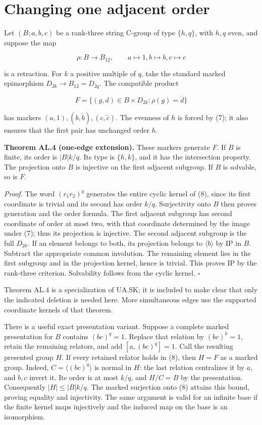 \section{Changing one adjacent order}\label{changing-one-adjacent-order}

Let \((B;a,b,c)\) be a rank-three string C-group of type \(\{h,q\}\), with
\(h,q\) even, and suppose the map

\[\rho:B\longrightarrow B_{12},\qquad a\mapsto1, b\mapsto b, c\mapsto c
\tag{7}\]

is a retraction. For \(k\) a positive multiple of \(q\), take the standard
marked epimorphism \(D_{2k}\to B_{12}=D_{2q}\). The compatible product

\[F=\{(g,d)\in B\times D_{2k}:\rho(g)=\overline d\}\tag{8}\]

has markers \((a,1),(b,\widetilde b),(c,\widetilde c)\). The evenness of
\(h\) is forced by (7); it also ensures that the first pair has unchanged
order \(h\).

\textbf{Theorem AL.4 (one-edge extension).} These markers generate \(F\). If \(B\) is finite, its order
is \(|B|k/q\). Its type is \(\{h,k\}\), and it has the intersection
property. The projection onto \(B\) is injective on the first adjacent
subgroup. If \(B\) is solvable, so is \(F\).

\emph{Proof.} The word \((r_1r_2)^q\) generates the entire cyclic kernel of
(8), since its first coordinate is trivial and its second has order
\(k/q\). Surjectivity onto \(B\) then proves generation and the order formula.
The first adjacent subgroup has second coordinate of order at most two,
with that coordinate determined by the image under (7); thus its
projection is injective. The second adjacent subgroup is the full
\(D_{2k}\). If an element belongs to both, its projection belongs to
\(\langle b\rangle\) by IP in \(B\). Subtract the appropriate common
involution. The remaining element lies in the first subgroup and in the
projection kernel, hence is trivial. This proves IP by the rank-three
criterion. Solvability follows from the cyclic kernel. \(\square\)

Theorem AL.4 is a specialization of UA.SK; it is included to make clear that
only the indicated deletion is needed here. More simultaneous edges use
the supported coordinate kernels of that theorem.

There is a useful exact presentation variant. Suppose a complete marked
presentation for \(B\) contains \((bc)^q=1\). Replace that relation by
\((bc)^k=1\), retain the remaining relators, and add
\([a,(bc)^q]=1\). Call the resulting presented group \(H\). If every retained
relator holds in (8), then \(H=F\) as a marked group. Indeed,
\(C=\langle(bc)^q\rangle\) is normal in \(H\): the last relation centralizes
it by \(a\), and \(b,c\) invert it. Its order is at most \(k/q\), and \(H/C=B\)
by the presentation. Consequently \(|H|\leq|B|k/q\). The marked
surjection onto (8) attains this bound, proving equality and injectivity.
The same argument is valid for an infinite base if the finite kernel
maps injectively and the induced map on the base is an isomorphism.
